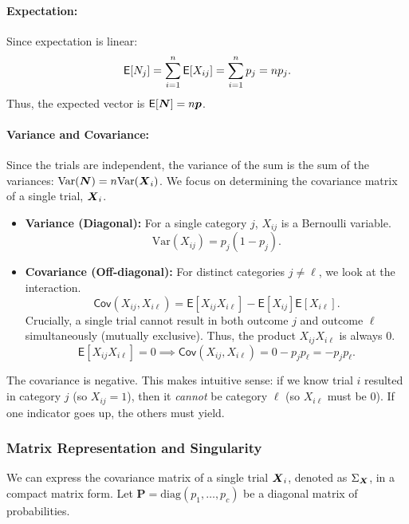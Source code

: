 \paragraph{Expectation:}
Since expectation is linear:
\[
    \mathsf{E}[N_j] = \sum_{i=1}^n \mathsf{E}[X_{ij}] = \sum_{i=1}^n p_j = n p_j.
\]
Thus, the expected vector is $\mathsf{E}[\boldsymbol{N}] = n \boldsymbol{p}$.

\paragraph{Variance and Covariance:}
Since the trials are independent, the variance of the sum is the sum of the variances: $\text{Var}(\boldsymbol{N}) = n \text{Var}(\boldsymbol{X}_i)$. We focus on determining the covariance matrix of a single trial, $\boldsymbol{X}_i$.

\begin{itemize}
    \item \textbf{Variance (Diagonal):} For a single category $j$, $X_{ij}$ is a Bernoulli variable.
    \[
        \text{Var}(X_{ij}) = p_j(1 - p_j).
    \]
    \item \textbf{Covariance (Off-diagonal):} For distinct categories $j \neq \ell$, we look at the interaction.
    \[
        \mathsf{Cov}(X_{ij}, X_{i\ell}) = \mathsf{E}[X_{ij}X_{i\ell}] - \mathsf{E}[X_{ij}]\mathsf{E}[X_{i\ell}].
    \]
    Crucially, a single trial cannot result in both outcome $j$ and outcome $\ell$ simultaneously (mutually exclusive). Thus, the product $X_{ij}X_{i\ell}$ is always 0.
    \[
        \mathsf{E}[X_{ij}X_{i\ell}] = 0 \implies \mathsf{Cov}(X_{ij}, X_{i\ell}) = 0 - p_j p_{\ell} = -p_j p_{\ell}.
    \]
\end{itemize}

\begin{note}
    The covariance is negative. This makes intuitive sense: if we know trial $i$ resulted in category $j$ (so $X_{ij}=1$), then it \textit{cannot} be category $\ell$ (so $X_{i\ell}$ must be 0). If one indicator goes up, the others must yield.
\end{note}

\subsubsection{Matrix Representation and Singularity}

We can express the covariance matrix of a single trial $\boldsymbol{X}_i$, denoted as $\Sigma_{\boldsymbol{X}}$, in a compact matrix form.
Let $\mathbf{P} = \text{diag}(p_1, \dots, p_c)$ be a diagonal matrix of probabilities.

